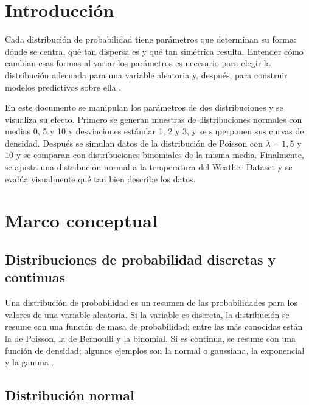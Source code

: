 \documentclass[11pt,letterpaper]{article}
\begin{document}
\portada
\indicegeneral


\section{Introducción}

Cada distribución de probabilidad tiene parámetros que determinan su forma: dónde se centra, qué tan dispersa es y qué tan simétrica resulta. Entender cómo cambian esas formas al variar los parámetros es necesario para elegir la distribución adecuada para una variable aleatoria y, después, para construir modelos predictivos sobre ella \parencite{tecnm2026_documento_fuente,brownlee2020}.

En este documento se manipulan los parámetros de dos distribuciones y se visualiza su efecto. Primero se generan muestras de distribuciones normales con medias 0, 5 y 10 y desviaciones estándar 1, 2 y 3, y se superponen sus curvas de densidad. Después se simulan datos de la distribución de Poisson con $\lambda = 1, 5$ y $10$ y se comparan con distribuciones binomiales de la misma media. Finalmente, se ajusta una distribución normal a la temperatura del Weather Dataset \parencite{witten2017} y se evalúa visualmente qué tan bien describe los datos.

\section{Marco conceptual}

\subsection{Distribuciones de probabilidad discretas y continuas}

Una distribución de probabilidad es un resumen de las probabilidades para los valores de una variable aleatoria. Si la variable es discreta, la distribución se resume con una función de masa de probabilidad; entre las más conocidas están la de Poisson, la de Bernoulli y la binomial. Si es continua, se resume con una función de densidad; algunos ejemplos son la normal o gaussiana, la exponencial y la gamma \parencite{tecnm2026_documento_fuente,brownlee2020}.

\subsection{Distribución normal}
\end{document}

